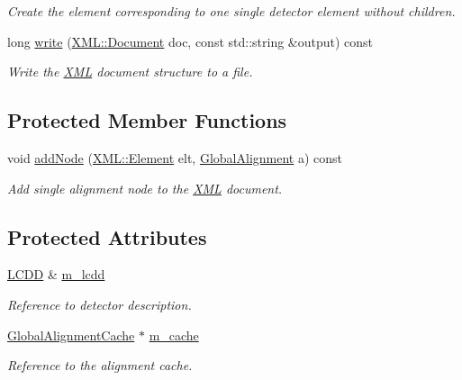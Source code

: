 \begin{DoxyCompactItemize}
\begin{DoxyCompactList}\small\item\em Create the element corresponding to one single detector element without children. \end{DoxyCompactList}\item 
long \hyperlink{class_d_d4hep_1_1_alignments_1_1_global_alignment_writer_aabe76e2b9db559cbf871294036517567}{write} (\hyperlink{class_d_d4hep_1_1_x_m_l_1_1_document}{X\+M\+L\+::\+Document} doc, const std\+::string \&output) const
\begin{DoxyCompactList}\small\item\em Write the \hyperlink{namespace_d_d4hep_1_1_x_m_l}{X\+ML} document structure to a file. \end{DoxyCompactList}\end{DoxyCompactItemize}
\subsection*{Protected Member Functions}
\begin{DoxyCompactItemize}
\item 
void \hyperlink{class_d_d4hep_1_1_alignments_1_1_global_alignment_writer_a0689a380ae43d7fcfc1a564569a65e9a}{add\+Node} (\hyperlink{class_d_d4hep_1_1_x_m_l_1_1_element}{X\+M\+L\+::\+Element} elt, \hyperlink{class_d_d4hep_1_1_alignments_1_1_global_alignment}{Global\+Alignment} a) const
\begin{DoxyCompactList}\small\item\em Add single alignment node to the \hyperlink{namespace_d_d4hep_1_1_x_m_l}{X\+ML} document. \end{DoxyCompactList}\end{DoxyCompactItemize}
\subsection*{Protected Attributes}
\begin{DoxyCompactItemize}
\item 
\hyperlink{class_d_d4hep_1_1_geometry_1_1_l_c_d_d}{L\+C\+DD} \& \hyperlink{class_d_d4hep_1_1_alignments_1_1_global_alignment_writer_a831748e7145b8b3b95da4e0b87a49f5f}{m\+\_\+lcdd}
\begin{DoxyCompactList}\small\item\em Reference to detector description. \end{DoxyCompactList}\item 
\hyperlink{class_d_d4hep_1_1_alignments_1_1_global_alignment_cache}{Global\+Alignment\+Cache} $\ast$ \hyperlink{class_d_d4hep_1_1_alignments_1_1_global_alignment_writer_a467b49352cf36fef9e92b1dfa407edec}{m\+\_\+cache}
\begin{DoxyCompactList}\small\item\em Reference to the alignment cache. \end{DoxyCompactList}\end{DoxyCompactItemize}



